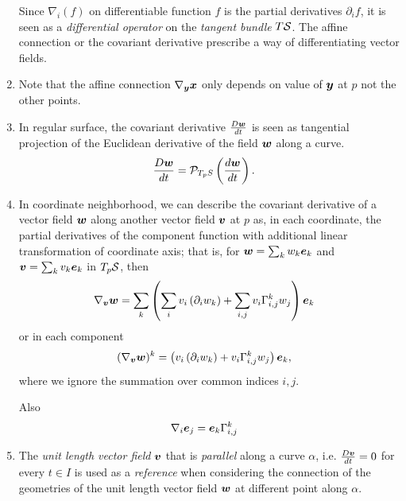 \documentclass[11pt]{article}
\begin{document}
\begin{enumerate}
Since $\nabla_{i}(f)$ on differentiable function $f$ is the partial derivatives $\partial_{i} f$, it is seen as a \emph{differential operator} on the \emph{tangent bundle} $T{\mathcal S}$. The affine connection or the covariant derivative prescribe a way of differentiating vector fields. 

\item Note that the affine connection $\nabla_{\boldsymbol{y}}\boldsymbol{x}$ only depends on value of $\boldsymbol{y}$ at $p$ not the other points. \\[5pt]

\item In regular surface, the covariant derivative $\frac{D\boldsymbol{w}}{dt}$ is seen as tangential projection of the Euclidean derivative of the field $\boldsymbol{w}$ along a curve. 
\begin{align*}
\frac{D\boldsymbol{w}}{dt} &= \mathcal{P}_{T_{p}S}\left(\frac{d\boldsymbol{w}}{dt} \right).
\end{align*}

\item In coordinate neighborhood, we can describe the covariant derivative of a vector field $\boldsymbol{w}$ along another vector field $\boldsymbol{v}$ at $p$ as, in each coordinate, the partial derivatives of the component function with additional linear transformation of coordinate axis; that is, for $\boldsymbol{w} = \sum_{k}w_{k}\boldsymbol{e}_{k}$ and $\boldsymbol{v} = \sum_{k}v_{k}\boldsymbol{e}_{k}$ in $T_{p}{\mathcal S}$, then 
\begin{align*}
\nabla_{\boldsymbol{v}}\boldsymbol{w} &=\sum_{k} \left( \sum_{i}v_{i}\left(\partial_{i}w_{k}\right) + \sum_{i,j}v_{i}\Gamma_{i,j}^{k}w_{j} \right)\boldsymbol{e}_{k}
\end{align*}
or in each component 
\begin{align*}
(\nabla_{\boldsymbol{v}}\boldsymbol{w})^{k} &= \left(v_{i}\left(\partial_{i}w_{k}\right) + v_{i}\Gamma_{i,j}^{k}w_{j} \right)\boldsymbol{e}_{k},
\end{align*}
where we ignore the summation over common indices $i,j$.

Also \begin{align*}
\nabla_{i}\boldsymbol{e}_{j}&= \boldsymbol{e}_{k}\Gamma_{i,j}^{k}
\end{align*}


\item The \emph{unit length vector field} $\boldsymbol{v}$ that is \emph{parallel} along a curve $\alpha$, i.e.  $\frac{D\boldsymbol{v}}{dt} = 0$ for every $t\in I$ is used as a \emph{reference} when considering the connection of the geometries of the unit length vector field $\boldsymbol{w}$ at different point along $\alpha$. 


\end{enumerate}
\end{document}
